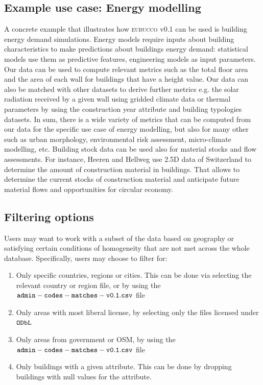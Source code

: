 \documentclass[fleqn,10pt]{wlscirep}
\begin{document}
\subsection*{Example use case: Energy modelling} 
A concrete example that illustrates how \textsc{eubucco} v0.1 can be used is building energy demand simulations. Energy models require inputs about building characteristics to make predictions about buildings energy demand: statistical models use them as predictive features, engineering models as input parameters. Our data can be used to compute relevant metrics such as the total floor area and the area of each wall for buildings that have a height value. Our data can also be matched with other datasets to derive further metrics e.g. the solar radiation received by a given wall using gridded climate data or thermal parameters by using the construction year attribute and building typologies datasets. In sum, there is a wide variety of metrics that can be computed from our data for the specific use case of energy modelling, but also for many other such as urban morphology, environmental risk assessment, micro-climate modelling, etc. 
Building stock data can be used also for material stocks and flow assessments. For instance, Heeren and Hellweg use 2.5D data of Switzerland to determine the amount of construction material in buildings. That allows to determine the current stocks of construction material and anticipate future material flows and opportunities for circular economy. \cite{heeren2019tracking}


\subsection*{Filtering options}
Users may want to work with a subset of the data based on geography or satisfying certain conditions of homogeneity that are not met across the whole database. Specifically, users may choose to filter for:
\begin{enumerate}[topsep=0.2pt]
    \itemsep-0.15em 
    \item Only specific countries, regions or cities. This can be done via selecting the relevant country or region file, or by using the ${\tt admin-codes-matches-v0.1.csv}$ file
    \item Only areas with most liberal license, by selecting only the files licensed under ${\tt ODbL}$   
    \item Only areas from government or OSM, by using the ${\tt admin-codes-matches-v0.1.csv}$ file
    \item Only buildings with a given attribute. This can be done by dropping buildings with null values for the attribute.
\end{enumerate}
\end{document}
